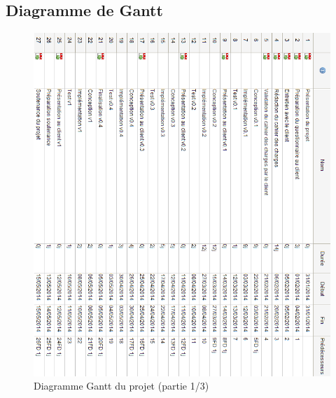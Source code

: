 \documentclass[a4paper, 12pt, twoside]{article}
\begin{document}
\newpage
\restoregeometry



\newpage\thispagestyle{empty}

\subsection{Diagramme de Gantt}

\begin{figure}[h]
  \center
  \includegraphics[scale=0.71]{diag_gant1.png}
  \caption{Diagramme Gantt du projet (partie 1/3)}
  \label{diagGant1}
\end{figure}
\end{document}
